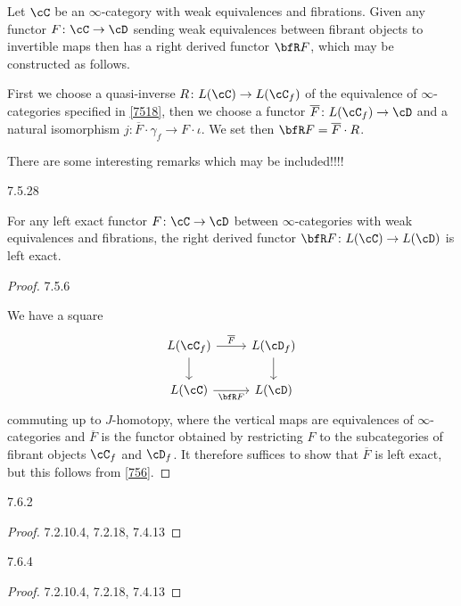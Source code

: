 \documentclass[a4paper,12pt]{scrartcl}
\begin{document}
\begin{construction}\label{7525}

  Let $\cC$ be an $\infty$-category with weak equivalences and fibrations. Given
  any functor $F\colon\cC\rightarrow\cD$ sending weak equivalences between
  fibrant objects to invertible maps then has a right derived functor $\bfR F$,
  which may be constructed as follows.

  First we choose a quasi-inverse $R\colon L(\cC)\rightarrow L(\cC_f)$ of the
  equivalence of $\infty$-categories specified in \ref{7518}, then we choose a
  functor $\overline{F}\colon L(\cC_f)\rightarrow\cD$ and a natural isomorphism
  $j\colon\overline{F}\cdot\gamma_f\rightarrow F\cdot\iota$. We set then $\bfR
  F=\overline{F}\cdot R$.
\end{construction}

There are some interesting remarks which may be included!!!!

\begin{prop}
  7.5.28

  For any left exact functor $F\colon\cC\rightarrow\cD$ between
  $\infty$-categories with weak equivalences and fibrations, the right derived
  functor $\bfR F\colon L(\cC)\rightarrow L(\cD)$ is left exact.
\end{prop}
\begin{proof}
  7.5.6

  We have a square
  \[\begin{tikzcd}
    {L(\cC_f)} & {L(\cD_f)} \\
    {L(\cC)} & {L(\cD)}
    \arrow["{\overline{F}}", from=1-1, to=1-2]
    \arrow[from=1-2, to=2-2]
    \arrow[from=1-1, to=2-1]
    \arrow["{\bfR F}"', from=2-1, to=2-2]
  \end{tikzcd}\]
  commuting up to $J$-homotopy, where the vertical maps are equivalences of
  $\infty$-categories and $\overline{F}$ is the functor obtained by restricting
  $F$ to the subcategories of fibrant objects $\cC_f$ and $\cD_f$. It therefore
  suffices to show that $\overline{F}$ is left exact, but this follows from
  \ref{756}.
\end{proof}

\begin{lem}
  7.6.2
\end{lem}
\begin{proof}
  7.2.10.4, 7.2.18, 7.4.13
\end{proof}

\begin{lem}
  7.6.4
\end{lem}
\begin{proof}
  7.2.10.4, 7.2.18, 7.4.13
\end{proof}
\end{document}
